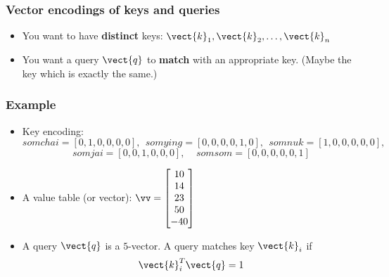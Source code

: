 \begin{frame}
  \frametitle{Vector encodings of keys and queries}

  \begin{itemize}
  \item You want to have {\bf distinct} keys: $\vect{k}_1,\vect{k}_2,\ldots,\vect{k}_n$
    \vspace{1in}
  \item You want a query $\vect{q}$ to {\bf match} with an appropriate key.
    (Maybe the key which is exactly the same.)
    \vspace{1in}
  \end{itemize}
\end{frame}

\begin{frame}
  \frametitle{Example}
  \begin{itemize}
  \item Key encoding:
    \[
    somchai = [0,1,0,0,0,0], \ \
    somying = [0,0,0,0,1,0], \ \
    somnuk = [1,0,0,0,0,0],
    \]
    \[
    somjai = [0,0,1,0,0,0], \ \ \ \ \
    somsom = [0,0,0,0,0,1]
    \]
  \item A value table (or vector):
    {\small
    $\vv = 
    \begin{bmatrix}
      10 \\ 14 \\ 23 \\ 50 \\ -40
    \end{bmatrix}
    $
    }
  \item A query $\vect{q}$ is a $5$-vector.  A query matches key
    $\vect{k}_i$ if
    \[
    \vect{k}_i^T\vect{q} = 1
    \]
    
  \end{itemize}
\end{frame}

